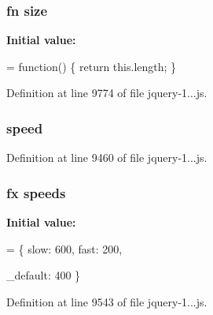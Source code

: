 \subsubsection[{size}]{ {\bf fn} size}\label{_scripts_2jquery-1_810_82_8js_afa6806c6ee5e63d5177f1dcc082ba6bc}
{\bfseries Initial value\+:}
\begin{DoxyCode}
= \textcolor{keyword}{function}() \{
    \textcolor{keywordflow}{return} this.length;
\}
\end{DoxyCode}


Definition at line 9774 of file jquery-\/1...\+js.

\hypertarget{_scripts_2jquery-1_810_82_8js_add98c90065e6563cba26ff6d2016c46c}{}
\subsubsection[{speed}]{ speed}\label{_scripts_2jquery-1_810_82_8js_add98c90065e6563cba26ff6d2016c46c}


Definition at line 9460 of file jquery-\/1...\+js.

\hypertarget{_scripts_2jquery-1_810_82_8js_a1079544ab08b6d4ca1692ce090f6ea2d}{}
\subsubsection[{speeds}]{ {\bf fx} speeds}\label{_scripts_2jquery-1_810_82_8js_a1079544ab08b6d4ca1692ce090f6ea2d}
{\bfseries Initial value\+:}
\begin{DoxyCode}
= \{
    slow: 600,
    fast: 200,
    
    \_default: 400
\}
\end{DoxyCode}


Definition at line 9543 of file jquery-\/1...\+js.

\hypertarget{_scripts_2jquery-1_810_82_8js_aef10902ffededd983608fdb8dbfc441a}{}
